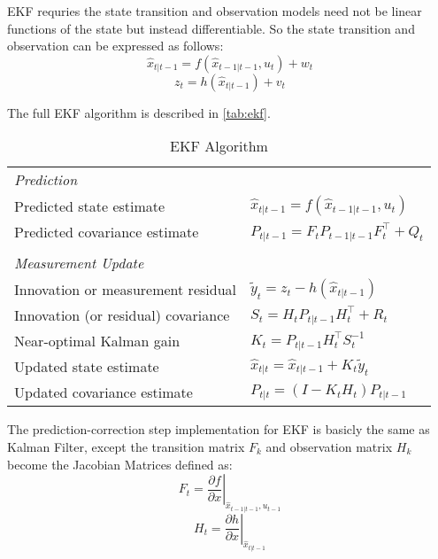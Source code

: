 \gls{EKF} requries the state transition and observation models need not be linear functions of the state but instead differentiable. So the state transition and observation can be expressed as follows: 
\begin{equation}
\hat{x}_{t|t-1} = f(\hat{x}_{t-1|t-1}, u_{t}) + w_{t} 
  \label{eq:trans}
\end{equation}
\begin{equation}
z_{t} = h(\hat{x}_{t|t-1}) + v_{t}
  \label{eq:observ}
\end{equation}

The full \gls{EKF} algorithm is described in \autoref{tab:ekf}.
\begin{table}[h]
\begin{adjustbox}{max width=\textwidth}
  \centering
  \begin{tabular}{ll}
 \textit{Prediction} & \\
Predicted state estimate & $\hat{x}_{t|t-1} = f(\hat{x}_{t-1|t-1}, u_{t})$ \\
Predicted covariance estimate & $P_{t|t-1} =  {{F_{t}}} P_{t-1|t-1}{ {F_{t}^\top}} + Q_{t}$ \\
&\\
\textit{Measurement Update} & \\
Innovation or measurement residual & $\tilde{y}_{t} = z_{t} - h(\hat{x}_{t|t-1})$ \\
Innovation (or residual) covariance & $S_{t} = {{H_{t}}}P_{t|t-1}{{H_{t}^\top}} + R_{t}$ \\
Near-optimal Kalman gain & $K_{t} = P_{t|t-1}{{H_{t}^\top}}S_{t}^{-1}$ \\
Updated state estimate & $\hat{x}_{t|t} = \hat{x}_{t|t-1} + K_{t}\tilde{y}_{t}$ \\
Updated covariance estimate & $P_{t|t} = (I - K_{t} {{H_{t}}}) P_{t|t-1}$ \\
   
  \end{tabular}
  \end{adjustbox}
  \caption{\gls{EKF} Algorithm}
  \label{tab:ekf}
\end{table}

The prediction-correction step implementation for \gls{EKF} is basicly the same as Kalman Filter, except the transition matrix $F_{k}$ and observation matrix $H_{k}$ become the Jacobian Matrices defined as: \\
$${{F_{t}}} = \left . \frac{\partial f}{\partial x } \right \vert _{\hat{x}_{t-1|t-1},u_{t-1}}$$
$${{H_{t}}} = \left . \frac{\partial h}{\partial x } \right \vert _{\hat{x}_{t|t-1}}$$


